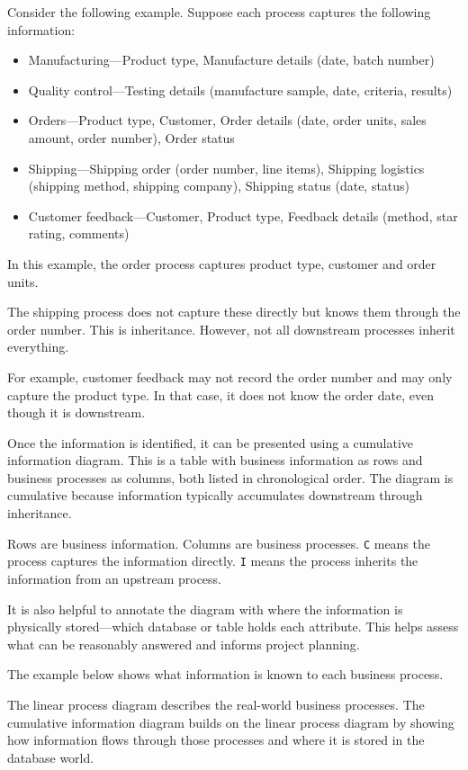 \documentclass[10pt,openany,10pt]{book}
\providecommand{\tightlist}{%
  \setlength{\itemsep}{0pt}\setlength{\parskip}{0pt}}
\begin{document}
Consider the following example. Suppose each process captures the
following information:

\begin{itemize}
\tightlist
\item
  Manufacturing---Product type, Manufacture details (date, batch number)
\item
  Quality control---Testing details (manufacture sample, date, criteria,
  results)
\item
  Orders---Product type, Customer, Order details (date, order units,
  sales amount, order number), Order status
\item
  Shipping---Shipping order (order number, line items), Shipping
  logistics (shipping method, shipping company), Shipping status (date,
  status)
\item
  Customer feedback---Customer, Product type, Feedback details (method,
  star rating, comments)
\end{itemize}

In this example, the order process captures product type, customer and
order units.

The shipping process does not capture these directly but knows them
through the order number. This is inheritance. However, not all
downstream processes inherit everything.

For example, customer feedback may not record the order number and may
only capture the product type. In that case, it does not know the order
date, even though it is downstream.

Once the information is identified, it can be presented using a
cumulative information diagram. This is a table with business
information as rows and business processes as columns, both listed in
chronological order. The diagram is cumulative because information
typically accumulates downstream through inheritance.

Rows are business information. Columns are business processes.
\texttt{C} means the process captures the information directly.
\texttt{I} means the process inherits the information from an upstream
process.

It is also helpful to annotate the diagram with where the information is
physically stored---which database or table holds each attribute. This
helps assess what can be reasonably answered and informs project
planning.

The example below shows what information is known to each business
process.

The linear process diagram describes the real-world business processes.
The cumulative information diagram builds on the linear process diagram
by showing how information flows through those processes and where it is
stored in the database world.
\end{document}
